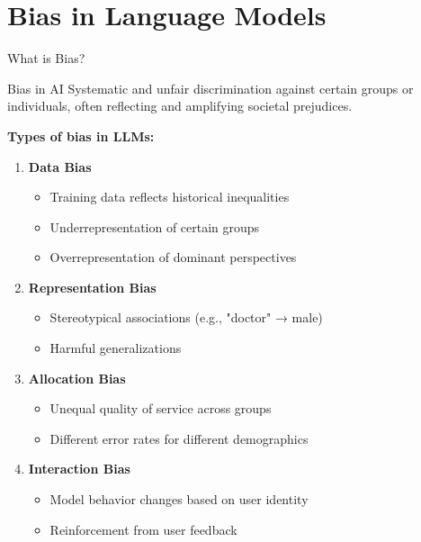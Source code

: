 \documentclass[aspectratio=169]{beamer}
\begin{document}
\section{Bias in Language Models}

\begin{frame}[shrink=10]{What is Bias? 🤔}
\small
\begin{block}{Bias in AI}
Systematic and unfair discrimination against certain groups or individuals, often reflecting and amplifying societal prejudices.
\end{block}

\vspace{0.5em}

\textbf{Types of bias in LLMs:}

\begin{enumerate}\setlength{\itemsep}{0pt}
    \item \textbf{Data Bias}
    \begin{itemize}\setlength{\itemsep}{0pt}
        \item Training data reflects historical inequalities
        \item Underrepresentation of certain groups
        \item Overrepresentation of dominant perspectives
    \end{itemize}

    \item \textbf{Representation Bias}
    \begin{itemize}\setlength{\itemsep}{0pt}
        \item Stereotypical associations (e.g., "doctor" → male)
        \item Harmful generalizations
    \end{itemize}

    \item \textbf{Allocation Bias}
    \begin{itemize}\setlength{\itemsep}{0pt}
        \item Unequal quality of service across groups
        \item Different error rates for different demographics
    \end{itemize}

    \item \textbf{Interaction Bias}
    \begin{itemize}\setlength{\itemsep}{0pt}
        \item Model behavior changes based on user identity
        \item Reinforcement from user feedback
    \end{itemize}
\end{enumerate}
\end{frame}
\end{document}
